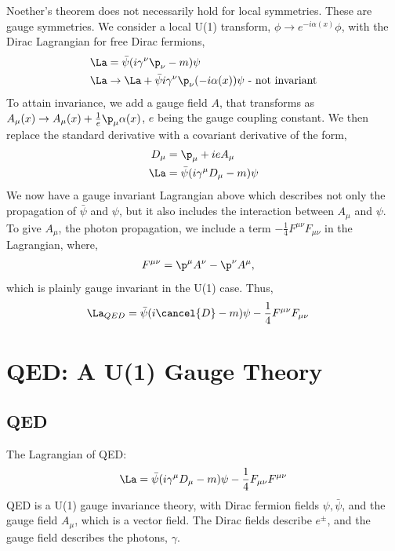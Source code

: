 \documentclass[a4paper, 11pt, normalem]{report}
\begin{document}
Noether's theorem does not necessarily hold for local symmetries.
These are gauge symmetries.
We consider a local U(1) transform, $\phi\to e^{-i\alpha(x)}\phi$, with the Dirac Lagrangian for free Dirac fermions,
\begin{align}
    \La &= \bar{\psi}(i\gamma^\nu\p_\nu - m)\psi \\
    \La &\to \La + \bar{\psi}i\gamma^\nu\p_\nu(-i\alpha(x))\psi \text{ - not invariant}
\end{align}
To attain invariance, we add a gauge field $A$, that transforms as $A_\mu(x)\to A_\mu(x)+\frac{1}{e}\p_\mu\alpha(x)$, $e$ being the gauge coupling constant.
We then replace the standard derivative with a covariant derivative of the form,
\begin{align}
    D_\mu &= \p_\mu + ieA_\mu \\
    \La &= \bar{\psi}(i\gamma^\mu D_\mu - m)\psi
\end{align}
We now have a gauge invariant Lagrangian above which describes not only the propagation of $\bar{\psi}$ and $\psi$, but it also includes the interaction between $A_\mu$ and $\psi$.
To give $A_\mu$, the photon propagation, we include a term $-\frac14 F^{\mu\nu}F_{\mu\nu}$ in the Lagrangian, where,
\begin{align}
    F^{\mu\nu} &= \p^\mu A^\nu - \p^\nu A^\mu,
\end{align}
which is plainly gauge invariant in the U(1) case.
Thus,
\begin{align}
    \La_{QED} &= \bar{\psi}(i\cancel{D} - m)\psi - \frac14 F^{\mu\nu}F_{\mu\nu}
\end{align}


\chapter{QED: A U(1) Gauge Theory}
\section{QED}
The Lagrangian of QED:
\begin{align}
    \La = \bar{\psi}(i\gamma^\mu D_\mu - m)\psi - \frac14 F_{\mu\nu}F^{\mu\nu}
\end{align}
QED is a U(1) gauge invariance theory, with Dirac fermion fields $\psi,\bar{\psi}$, and the gauge field $A_\mu$, which is a vector field.
The Dirac fields describe $e^{\pm}$, and the gauge field describes the photons, $\gamma$.
\end{document}
